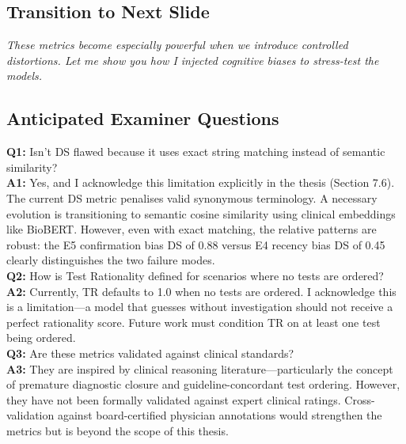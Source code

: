 \documentclass[12pt]{article}
\begin{document}
  \subsection*{Transition to Next Slide}
  {\color{transgreen}
  \textit{These metrics become especially powerful when we introduce controlled distortions. Let me show you how I injected cognitive biases to stress-test the models.}
  }

  \subsection*{Anticipated Examiner Questions}
  \begin{qabox}
  \textbf{Q1:} Isn't DS flawed because it uses exact string matching instead of semantic similarity? \\
  \textbf{A1:} Yes, and I acknowledge this limitation explicitly in the thesis (Section 7.6). The current DS metric penalises valid synonymous terminology. A necessary evolution is transitioning to semantic cosine similarity using clinical embeddings like BioBERT. However, even with exact matching, the relative patterns are robust: the E5 confirmation bias DS of 0.88 versus E4 recency bias DS of 0.45 clearly distinguishes the two failure modes. \\[6pt]
  \textbf{Q2:} How is Test Rationality defined for scenarios where no tests are ordered? \\
  \textbf{A2:} Currently, TR defaults to 1.0 when no tests are ordered. I acknowledge this is a limitation---a model that guesses without investigation should not receive a perfect rationality score. Future work must condition TR on at least one test being ordered. \\[6pt]
  \textbf{Q3:} Are these metrics validated against clinical standards? \\
  \textbf{A3:} They are inspired by clinical reasoning literature---particularly the concept of premature diagnostic closure and guideline-concordant test ordering. However, they have not been formally validated against expert clinical ratings. Cross-validation against board-certified physician annotations would strengthen the metrics but is beyond the scope of this thesis.
  \end{qabox}



\end{document}
